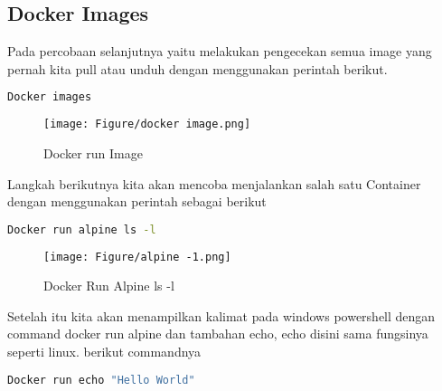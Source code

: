 \documentclass[11pt,a4paper]{article}
\begin{document}
\subsection{Docker Images}
Pada percobaan selanjutnya yaitu melakukan pengecekan semua image yang pernah kita pull atau unduh dengan menggunakan perintah berikut.
\begin{lstlisting}[language = bash]
	Docker images
\end{lstlisting}
\begin{figure}[h]
	\centering
	\texttt{[image: Figure/docker image.png]}
	\caption{Docker run Image}
\end{figure}
Langkah berikutnya kita akan mencoba menjalankan salah satu Container dengan menggunakan perintah sebagai berikut
\begin{lstlisting}[language = bash]
	Docker run alpine ls -l
\end{lstlisting} 
\begin{figure}[h]
	\centering
	\texttt{[image: Figure/alpine -1.png]}
	\caption{Docker Run Alpine ls -l}
\end{figure}
Setelah itu kita akan menampilkan kalimat pada windows powershell dengan command docker run alpine dan tambahan echo, echo disini sama fungsinya seperti linux. berikut commandnya
\begin{lstlisting}[language=bash]
	Docker run echo "Hello World"
\end{lstlisting}
\end{document}
